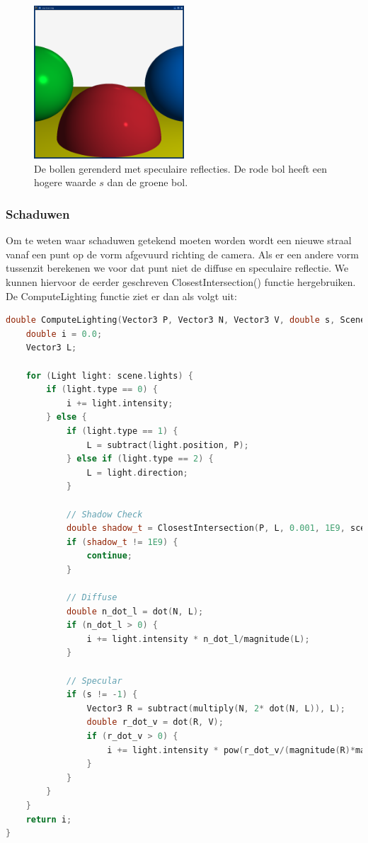 \documentclass[12pt, a4paper]{article}
\begin{document}
\begin{figure}[H]
    \centering
    \includegraphics[width=0.50\textwidth]{renders/specular.png}
    \caption{De bollen gerenderd met speculaire reflecties. De rode bol heeft een hogere waarde $s$ dan de groene bol.}
    \label{fig:specular}
\end{figure}

\subsubsection{Schaduwen}
Om te weten waar schaduwen getekend moeten worden wordt een nieuwe straal vanaf een punt op de vorm afgevuurd richting de camera. Als er een andere vorm tussenzit berekenen we voor dat punt niet de diffuse en speculaire reflectie. We kunnen hiervoor de eerder geschreven ClosestIntersection() functie hergebruiken. De ComputeLighting functie ziet er dan als volgt uit:

\begin{lstlisting}[language=C++]
double ComputeLighting(Vector3 P, Vector3 N, Vector3 V, double s, Scene scene) {
    double i = 0.0;
    Vector3 L;

    for (Light light: scene.lights) {
        if (light.type == 0) {
            i += light.intensity;
        } else {
            if (light.type == 1) {
                L = subtract(light.position, P);
            } else if (light.type == 2) {
                L = light.direction;
            }

            // Shadow Check
            double shadow_t = ClosestIntersection(P, L, 0.001, 1E9, scene).second;
            if (shadow_t != 1E9) {
                continue;
            } 

            // Diffuse
            double n_dot_l = dot(N, L);
            if (n_dot_l > 0) {
                i += light.intensity * n_dot_l/magnitude(L);
            }

            // Specular
            if (s != -1) {
                Vector3 R = subtract(multiply(N, 2* dot(N, L)), L);
                double r_dot_v = dot(R, V);
                if (r_dot_v > 0) {
                    i += light.intensity * pow(r_dot_v/(magnitude(R)*magnitude(V)), s);
                }
            }
        }
    }
    return i;
}
\end{lstlisting}
\end{document}
